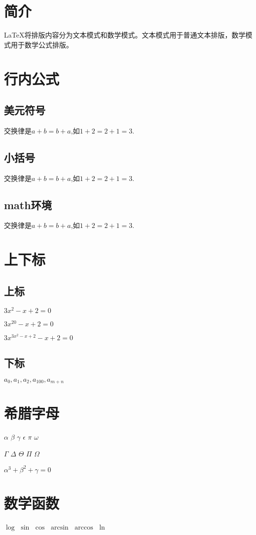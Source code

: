 \documentclass{article}
\begin{document}
	\section{简介}
	\LaTeX{}将排版内容分为文本模式和数学模式。文本模式用于普通文本排版，数学模式用于数学公式排版。
	\section{行内公式}
		\subsection{美元符号}
		交换律是$a+b=b+a$,如$1+2=2+1=3$.
		\subsection{小括号}
		交换律是\(a+b=b+a\),如\(1+2=2+1=3\).
		\subsection{math环境}
		交换律是\begin{math}a+b=b+a\end{math},如\begin{math}1+2=2+1=3\end{math}.
	\section{上下标}
		\subsection{上标}
		$3x^2-x+2=0$
		
		$3x^{20}-x+2=0$
		
		$3x^{3x^2-x+2}-x+2=0$
		\subsection{下标}
		$a_0, a_1, a_2, a_{100}, a_{m+n}$
	\section{希腊字母}
	$\alpha$
	$\beta$
	$\gamma$
	$\epsilon$
	$\pi$
	$\omega$
	
	$\Gamma$
	$\Delta$
	$\Theta$
	$\Pi$
	$\Omega$
	
	$\alpha^3+\beta^2+\gamma=0$
	\section{数学函数}
	$\log$
	$\sin$
	$\cos$
	$\arcsin$
	$\arccos$
	$\ln$
	
\end{document}
